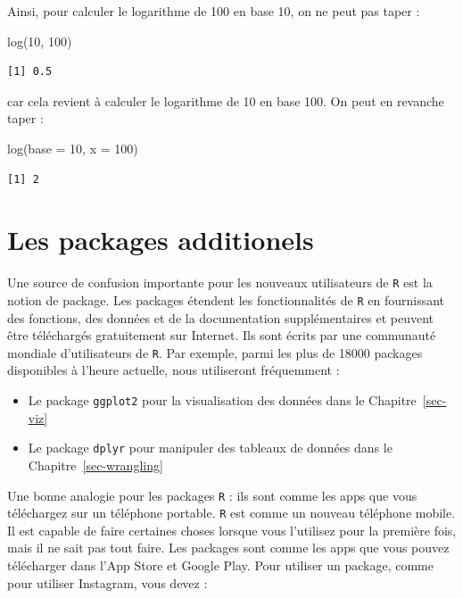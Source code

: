 \documentclass[
  a4paper,
  DIV=11,
  numbers=noendperiod,
  oneside]{scrreprt}
\newenvironment{Shaded}{}{}
\newcommand{\AttributeTok}[1]{\textcolor[rgb]{0.84,0.23,0.29}{#1}}
\newcommand{\DecValTok}[1]{\textcolor[rgb]{0.00,0.36,0.77}{#1}}
\newcommand{\FunctionTok}[1]{\textcolor[rgb]{0.44,0.26,0.76}{#1}}
\newcommand{\NormalTok}[1]{\textcolor[rgb]{0.14,0.16,0.18}{#1}}
\providecommand{\tightlist}{%
  \setlength{\itemsep}{0pt}\setlength{\parskip}{0pt}}\usepackage{longtable,booktabs,array}
\begin{document}
Ainsi, pour calculer le logarithme de 100 en base 10, on ne peut pas
taper :

\begin{Shaded}
\begin{Highlighting}[]
\FunctionTok{log}\NormalTok{(}\DecValTok{10}\NormalTok{, }\DecValTok{100}\NormalTok{)}
\end{Highlighting}
\end{Shaded}

\begin{verbatim}
[1] 0.5
\end{verbatim}

car cela revient à calculer le logarithme de 10 en base 100. On peut en
revanche taper :

\begin{Shaded}
\begin{Highlighting}[]
\FunctionTok{log}\NormalTok{(}\AttributeTok{base =} \DecValTok{10}\NormalTok{, }\AttributeTok{x =} \DecValTok{100}\NormalTok{)}
\end{Highlighting}
\end{Shaded}

\begin{verbatim}
[1] 2
\end{verbatim}

\section{Les packages additionels}\label{sec-packages}

Une source de confusion importante pour les nouveaux utilisateurs de
\texttt{R} est la notion de package. Les packages étendent les
fonctionnalités de \texttt{R} en fournissant des fonctions, des données
et de la documentation supplémentaires et peuvent être téléchargés
gratuitement sur Internet. Ils sont écrits par une communauté mondiale
d'utilisateurs de \texttt{R}. Par exemple, parmi les plus de 18000
packages disponibles à l'heure actuelle, nous utiliseront fréquemment :

\begin{itemize}
\tightlist
\item
  Le package \texttt{ggplot2} pour la visualisation des données dans le
  Chapitre~\ref{sec-viz}
\item
  Le package \texttt{dplyr} pour manipuler des tableaux de données dans
  le Chapitre~\ref{sec-wrangling}
\end{itemize}

Une bonne analogie pour les packages \texttt{R} : ils sont comme les
apps que vous téléchargez sur un téléphone portable. \texttt{R} est
comme un nouveau téléphone mobile. Il est capable de faire certaines
choses lorsque vous l'utilisez pour la première fois, mais il ne sait
pas tout faire. Les packages sont comme les apps que vous pouvez
télécharger dans l'App Store et Google Play. Pour utiliser un package,
comme pour utiliser Instagram, vous devez :
\end{document}
